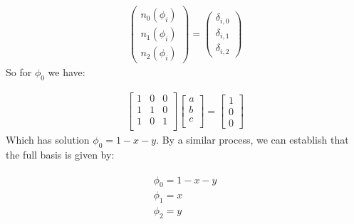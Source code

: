 \documentclass{book}
\begin{document}
\label{\detokenize{2_finite_elements:equation-2_finite_elements:1}}\begin{equation}\label{equation:2_finite_elements:2_finite_elements:1}
\begin{split}\begin{pmatrix}
n_0(\phi_i)\\
n_1(\phi_i)\\
n_2(\phi_i)
\end{pmatrix}
=
\begin{pmatrix}
\delta_{i,0}\\
\delta_{i,1}\\
\delta_{i,2}
\end{pmatrix}\end{split}
\end{equation}
So for \(\phi_0\) we have:

\label{\detokenize{2_finite_elements:equation-phimat}}\begin{equation}\label{equation:2_finite_elements:phimat}
\begin{split}\begin{bmatrix}
1 & 0 & 0\\
1 & 1 & 0\\
1 & 0 & 1\\
\end{bmatrix}
\begin{bmatrix}
a\\
b\\
c\\
\end{bmatrix}
=
\begin{bmatrix}
1 \\
0 \\
0
\end{bmatrix}\end{split}
\end{equation}
Which has solution \(\phi_0 = 1 - x - y\). By a similar process,
we can establish that the full basis is given by:

\label{\detokenize{2_finite_elements:equation-2_finite_elements:2}}\begin{align}\label{equation:2_finite_elements:2_finite_elements:2}\!\begin{aligned}
\phi_0 = 1 - x - y\\
\phi_1 = x\\
\phi_2 = y\\
\end{aligned}\end{align}
\end{document}
